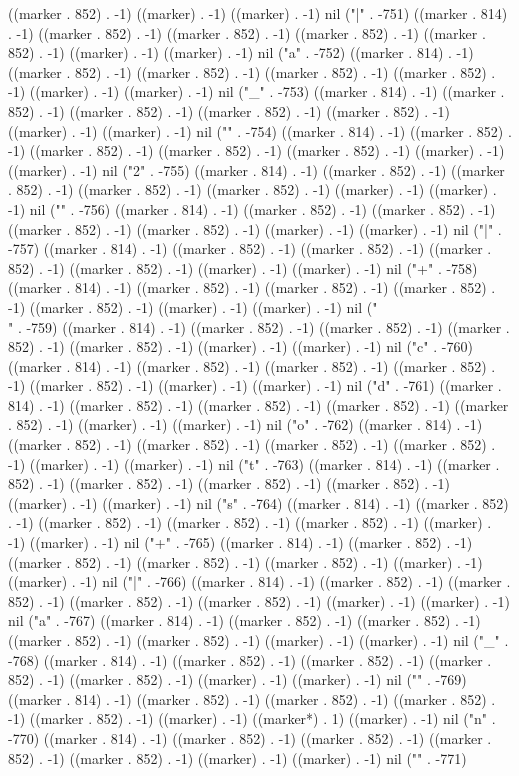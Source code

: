 ((marker . 852) . -1) ((marker) . -1) ((marker) . -1) nil ("|" . -751) ((marker . 814) . -1) ((marker . 852) . -1) ((marker . 852) . -1) ((marker . 852) . -1) ((marker . 852) . -1) ((marker) . -1) ((marker) . -1) nil ("a" . -752) ((marker . 814) . -1) ((marker . 852) . -1) ((marker . 852) . -1) ((marker . 852) . -1) ((marker . 852) . -1) ((marker) . -1) ((marker) . -1) nil ("_" . -753) ((marker . 814) . -1) ((marker . 852) . -1) ((marker . 852) . -1) ((marker . 852) . -1) ((marker . 852) . -1) ((marker) . -1) ((marker) . -1) nil ("{" . -754) ((marker . 814) . -1) ((marker . 852) . -1) ((marker . 852) . -1) ((marker . 852) . -1) ((marker . 852) . -1) ((marker) . -1) ((marker) . -1) nil ("2" . -755) ((marker . 814) . -1) ((marker . 852) . -1) ((marker . 852) . -1) ((marker . 852) . -1) ((marker . 852) . -1) ((marker) . -1) ((marker) . -1) nil ("}" . -756) ((marker . 814) . -1) ((marker . 852) . -1) ((marker . 852) . -1) ((marker . 852) . -1) ((marker . 852) . -1) ((marker) . -1) ((marker) . -1) nil ("|" . -757) ((marker . 814) . -1) ((marker . 852) . -1) ((marker . 852) . -1) ((marker . 852) . -1) ((marker . 852) . -1) ((marker) . -1) ((marker) . -1) nil ("+" . -758) ((marker . 814) . -1) ((marker . 852) . -1) ((marker . 852) . -1) ((marker . 852) . -1) ((marker . 852) . -1) ((marker) . -1) ((marker) . -1) nil ("\\" . -759) ((marker . 814) . -1) ((marker . 852) . -1) ((marker . 852) . -1) ((marker . 852) . -1) ((marker . 852) . -1) ((marker) . -1) ((marker) . -1) nil ("c" . -760) ((marker . 814) . -1) ((marker . 852) . -1) ((marker . 852) . -1) ((marker . 852) . -1) ((marker . 852) . -1) ((marker) . -1) ((marker) . -1) nil ("d" . -761) ((marker . 814) . -1) ((marker . 852) . -1) ((marker . 852) . -1) ((marker . 852) . -1) ((marker . 852) . -1) ((marker) . -1) ((marker) . -1) nil ("o" . -762) ((marker . 814) . -1) ((marker . 852) . -1) ((marker . 852) . -1) ((marker . 852) . -1) ((marker . 852) . -1) ((marker) . -1) ((marker) . -1) nil ("t" . -763) ((marker . 814) . -1) ((marker . 852) . -1) ((marker . 852) . -1) ((marker . 852) . -1) ((marker . 852) . -1) ((marker) . -1) ((marker) . -1) nil ("s" . -764) ((marker . 814) . -1) ((marker . 852) . -1) ((marker . 852) . -1) ((marker . 852) . -1) ((marker . 852) . -1) ((marker) . -1) ((marker) . -1) nil ("+" . -765) ((marker . 814) . -1) ((marker . 852) . -1) ((marker . 852) . -1) ((marker . 852) . -1) ((marker . 852) . -1) ((marker) . -1) ((marker) . -1) nil ("|" . -766) ((marker . 814) . -1) ((marker . 852) . -1) ((marker . 852) . -1) ((marker . 852) . -1) ((marker . 852) . -1) ((marker) . -1) ((marker) . -1) nil ("a" . -767) ((marker . 814) . -1) ((marker . 852) . -1) ((marker . 852) . -1) ((marker . 852) . -1) ((marker . 852) . -1) ((marker) . -1) ((marker) . -1) nil ("_" . -768) ((marker . 814) . -1) ((marker . 852) . -1) ((marker . 852) . -1) ((marker . 852) . -1) ((marker . 852) . -1) ((marker) . -1) ((marker) . -1) nil ("{" . -769) ((marker . 814) . -1) ((marker . 852) . -1) ((marker . 852) . -1) ((marker . 852) . -1) ((marker . 852) . -1) ((marker) . -1) ((marker*) . 1) ((marker) . -1) nil ("n" . -770) ((marker . 814) . -1) ((marker . 852) . -1) ((marker . 852) . -1) ((marker . 852) . -1) ((marker . 852) . -1) ((marker) . -1) ((marker) . -1) nil ("}" . -771) 